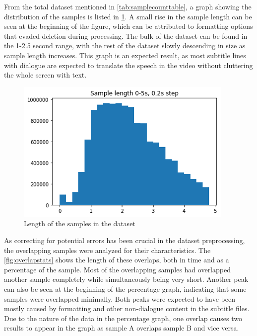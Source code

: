 From the total dataset mentioned in \cref{tab:samplecounttable}, a graph showing the distribution of the samples is listed in \cref{fig:samplelength}.
A small rise in the sample length can be seen at the beginning of the figure, which can be attributed to formatting options that evaded deletion during processing.
The bulk of the dataset can be found in the 1-2.5 second range, with the rest of the dataset slowly descending in size as sample length increases.
This graph is an expected result, as most subtitle lines with dialogue are expected to translate the speech in the video without cluttering the whole screen with text.

\begin{figure}[htbp]  %
  \centering
  \includegraphics[width=.5\textwidth]{figures/sample0-5.png}
  \caption{Length of the samples in the dataset}
  \label{fig:samplelength}
\end{figure}

As correcting for potential errors has been crucial in the dataset preprocessing, the overlapping samples were analyzed for their characteristics.
The \cref{fig:overlapstats} shows the length of these overlaps, both in time and as a percentage of the sample.
Most of the overlapping samples had overlapped another sample completely while simultaneously being very short.
Another peak can also be seen at the beginning of the percentage graph, indicating that some samples were overlapped minimally.
Both peaks were expected to have been mostly caused by formatting and other non-dialogue content in the subtitle files.
Due to the nature of the data in the percentage graph, one overlap causes two results to appear in the graph as sample A overlaps sample B and vice versa.

